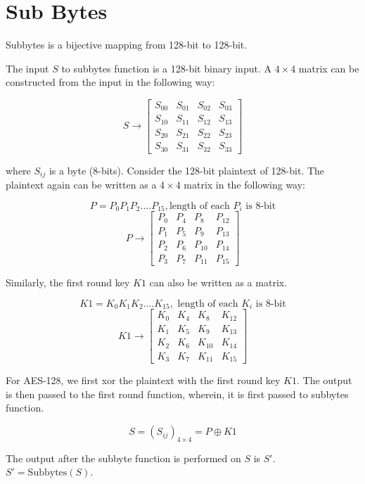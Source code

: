 \documentclass[11pt]{article}
\begin{document}
\section{Sub Bytes}

Subbytes is a bijective mapping from 128-bit to 128-bit. 

The input $S$ to subbytes function is a 128-bit binary input. A $4 \times 4$ matrix can be constructed from the input in the following way:

\[ S \rightarrow \begin{bmatrix} S_{00} & S_{01} & S_{02} & S_{03} \\ S_{10} & S_{11} & S_{12} & S_{13} \\ S_{20} & S_{21} & S_{22} & S_{23} \\ S_{30} & S_{31} & S_{32} & S_{33} \end{bmatrix} \]

where $S_{ij}$ is a byte (8-bits). Consider the 128-bit plaintext of 128-bit. The plaintext again can be written as a $4 \times 4$ matrix in the following way:

\[ P = P_0P_1P_2....P_{15}, \text{length of each } P_i \text{ is 8-bit} \]
\[ P \rightarrow \begin{bmatrix} P_0 & P_4 & P_8 & P_{12} \\ P_1 & P_5 & P_9 & P_{13} \\ P_2 & P_6 & P_{10} & P_{14} \\ P_3 & P_7 & P_{11} & P_{15} \end{bmatrix} \]

Similarly, the first round key $K1$ can also be written as a matrix.

\[ K1 = K_0K_1K_2....K_{15}, \text{ length of each } K_i \text{ is 8-bit} \]
\[ K1 \rightarrow \begin{bmatrix} K_0 & K_4 & K_8 & K_{12} \\ K_1 & K_5 & K_9 & K_{13} \\ K_2 & K_6 & K_{10} & K_{14} \\ K_3 & K_7 & K_{11} & K_{15} \end{bmatrix} \]

For AES-128, we first xor the plaintext with the first round key $K1$. The output is then passed to the first round function, wherein, it is first passed to subbytes function.

\[ S = (S_{ij})_{4 \times 4} = P \oplus K1 \]

The output after the subbyte function is performed on $S$ is $S'$. $S' = \text{Subbytes}(S)$.
\end{document}
